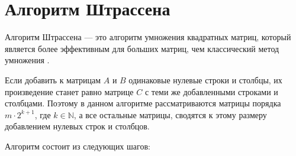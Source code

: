 \section{Алгоритм Штрассена}

Алгоритм Штрассена — это алгоритм умножения квадратных матриц, который является более эффективным для больших матриц, чем классический метод умножения \cite{strassen}.

Если добавить к матрицам $A$ и $B$ одинаковые нулевые строки и столбцы, их произведение станет равно матрице $C$ с теми же добавленными строками и столбцами. Поэтому в данном алгоритме рассматриваются матрицы порядка $m \cdot 2^{k + 1}$, где $ k \in \mathbb{N} $, а все остальные матрицы, сводятся к этому размеру добавлением нулевых строк и столбцов. 

Алгоритм состоит из следующих шагов:

